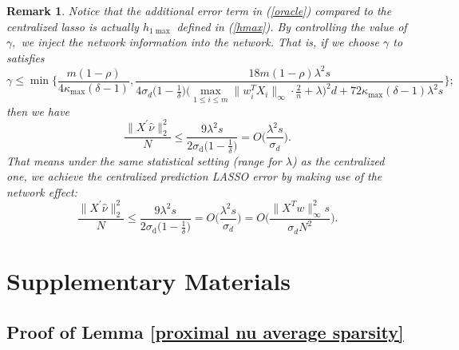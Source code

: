 \documentclass{article}
\theoremstyle{break}
\newtheorem*{remark}{Remark}
\begin{document}
\begin{remark}
Notice that the additional error term in (\ref{oracle}) compared to the centralized lasso is actually $h_{1\max}$ defined in (\ref{hmax}).
By controlling the value of $\gamma,$
we inject the network information into the network. That is, if we choose $\gamma$ to satisfies
\begin{equation}\label{proximal deterministic gamma final}
    \gamma\leq \min\bigg\{\frac{m(1-\rho)}{4\kappa_{\max}(\delta-1)}, \frac{18m(1-\rho)\lambda^2s}{4\sigma_d\bigg(1-\frac{1}{\delta}\bigg)\bigg(\max\limits_{1\leq i\leq m}\lVert w_i^TX_i\rVert_{\infty}\cdot \frac{2}{n}+\lambda\bigg)^2d+72\kappa_{\max}(\delta-1)\lambda^2s}\bigg\};
\end{equation} 
    then we have
    \begin{equation}
        \frac{\lVert X^{'}\hat{\nu}\rVert_2^2}{N}\leq\frac{9\lambda^2s}{2\sigma_{\text{d}}\bigg(1-\frac{1}{\delta}\bigg)}=O\bigg(\frac{\lambda^2s}{\sigma_d}\bigg).
    \end{equation}
That means under the same statistical setting (range for $\lambda$) as the centralized one, we achieve the centralized prediction LASSO error by making use of the network effect:
\begin{equation}
     \frac{\lVert X^{'}\hat{\nu}\rVert_2^2}{N}\leq\frac{9\lambda^2s}{2\sigma_{\text{d}}\bigg(1-\frac{1}{\delta}\bigg)}= O\bigg(\frac{\lambda^2s}{\sigma_d}\bigg)=O\bigg(\frac{\lVert X^{T}w\rVert_{\infty}^2s}{\sigma_d N^2}\bigg).
\end{equation}
\end{remark}

\appendix
\section*{Supplementary Materials}
\renewcommand{\thesubsection}{\Alph{subsection}}

\subsection{Proof of Lemma \ref{proximal nu average sparsity}}
\end{document}
